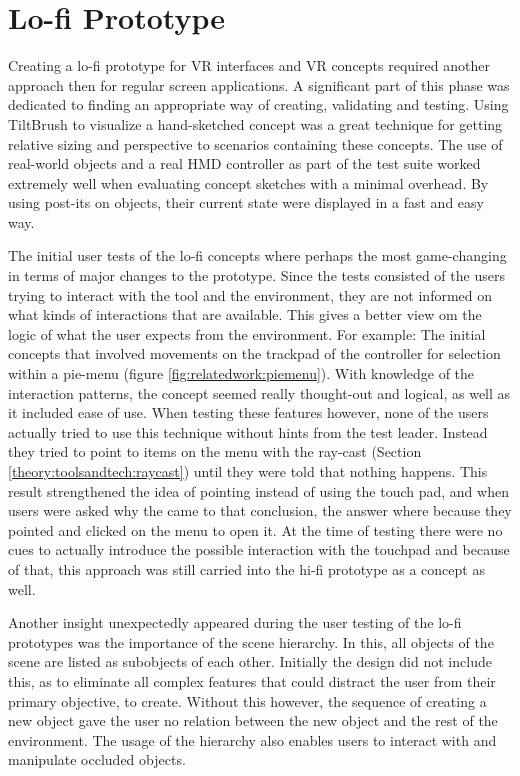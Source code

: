 \section{Lo-fi Prototype}
Creating a lo-fi prototype for VR interfaces and VR concepts required another approach then for regular screen applications. A significant part of this phase was dedicated to finding an appropriate way of creating, validating and testing. Using TiltBrush to visualize a hand-sketched concept was a great technique for getting relative sizing and perspective to scenarios containing these concepts. The use of real-world objects and a real HMD controller as part of the test suite worked extremely well when evaluating concept sketches with a minimal overhead. By using post-its on objects, their current state were displayed in a fast and easy way.

The initial user tests of the lo-fi concepts where perhaps the most game-changing in terms of major changes to the prototype. Since the tests consisted of the users trying to interact with the tool and the environment, they are not informed on what kinds of interactions that are available. This gives a better view om the logic of what the user expects from the environment. For example: The initial concepts that involved movements on the trackpad of the controller for selection within a pie-menu (figure \ref{fig:relatedwork:piemenu}). With knowledge of the interaction patterns, the concept seemed really thought-out and logical, as well as it included ease of use. When testing these features however, none of the users actually tried to use this technique without hints from the test leader. Instead they tried to point to items on the menu with the ray-cast (Section \ref{theory:toolsandtech:raycast}) until they were told that nothing happens. This result strengthened the idea of pointing instead of using the touch pad, and when users were asked why the came to that conclusion, the answer where because they pointed and clicked on the menu to open it. At the time of testing there were no cues to actually introduce the possible interaction with the touchpad and because of that, this approach was still carried into the hi-fi prototype as a concept as well.

Another insight unexpectedly appeared during the user testing of the lo-fi prototypes was the importance of the scene hierarchy. In this, all objects of the scene are listed as subobjects of each other. Initially the design did not include this, as to eliminate all complex features that could distract the user from their primary objective, to create. Without this however, the sequence of creating a new object gave the user no relation between the new object and the rest of the environment. The usage of the hierarchy also enables users to interact with and manipulate occluded objects.


